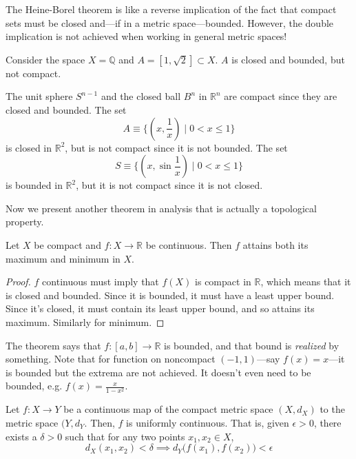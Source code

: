   The Heine-Borel theorem is like a reverse implication of the fact that compact sets must be closed and---if in a metric space---bounded. However, the double implication is not achieved when working in general metric spaces!

  \begin{example}
    Consider the space $X = \mathbb{Q}$ and $A = [1, \sqrt{2}] \subset X$. $A$ is closed and bounded, but not compact. 
  \end{example}

  \begin{example}
    The unit sphere $S^{n-1}$ and the closed ball $B^n$ in $\mathbb{R}^n$ are compact since they are closed and bounded. The set
    \begin{equation}
      A \equiv \{(x, \frac{1}{x}) \; | \; 0 < x \leq 1\}
    \end{equation}
    is closed in $\mathbb{R}^2$, but is not compact since it is not bounded. The set 
    \begin{equation}
      S \equiv \{(x, \sin{\frac{1}{x}}) \; | \; 0<x\leq 1\}
    \end{equation}
    is bounded in $\mathbb{R}^2$, but it is not compact since it is not closed. 
  \end{example}

  Now we present another theorem in analysis that is actually a topological property. 

  \begin{theorem}
    Let $X$ be compact and $f: X \rightarrow \mathbb{R}$ be continuous. Then $f$ attains both its maximum and minimum in $X$.  
  \end{theorem}
  \begin{proof}
    $f$ continuous must imply that $f(X)$ is compact in $\mathbb{R}$, which means that it is closed and bounded. Since it is bounded, it must have a least upper bound. Since it's closed, it must contain its least upper bound, and so attains its maximum. Similarly for minimum.
  \end{proof}

  The theorem says that $f: [a, b] \to \mathbb{R}$ is bounded, and that bound is \textit{realized} by something. Note that for function on noncompact $(-1, 1)$---say $f(x) = x$---it is bounded but the extrema are not achieved. It doesn't even need to be bounded, e.g. $f(x) = \frac{x}{1 - x^2}$. 

  \begin{theorem}
    Let $f: X \rightarrow Y$ be a continuous map of the compact metric space $(X,d_X)$ to the metric space $(Y, d_Y$. Then, $f$ is uniformly continuous. That is, given $\epsilon > 0$, there exists a $\delta > 0$ such that for any two points $x_1, x_2 \in X$, 
    \begin{equation}
      d_X (x_1, x_2) < \delta \implies d_Y \big( f(x_1), f(x_2)\big) < \epsilon
    \end{equation}
  \end{theorem}

